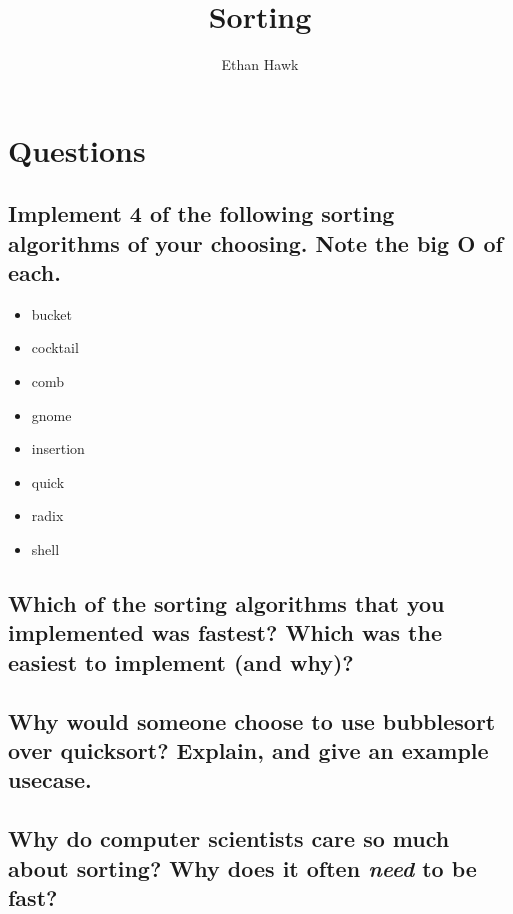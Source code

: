 \documentclass{article}
\title{Sorting}
\author{Ethan Hawk}
\begin{document}
\maketitle

\section*{Questions}

\subsection{Implement 4 of the following sorting algorithms of your choosing. Note the big O of each.}

\begin{itemize}
\item bucket
\item cocktail
\item comb
\item gnome
\item insertion
\item quick
\item radix
\item shell
\end{itemize}


\subsection{Which of the sorting algorithms that you implemented was fastest? Which was the easiest to implement (and why)?}

\vspace{144pt}

\subsection{Why would someone choose to use bubblesort over quicksort? Explain, and give an example usecase.}

\vspace{144pt}

\subsection{Why do computer scientists care so much about sorting? Why does it often \textit{need} to be fast?}

\vspace{144pt}
\end{document}
